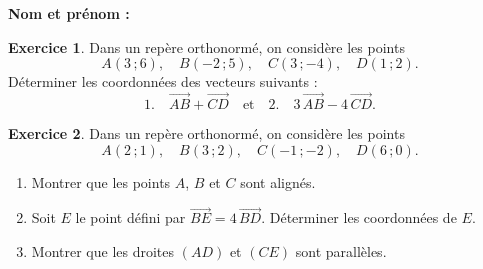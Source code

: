\documentclass{article}
\theoremstyle{definition}
\newtheorem{exercice}{Exercice}
\begin{document}
\pagestyle{fancy}

\fancyhf{} %
\fancyhead[L]{\large \textbf{\Niveau}}
\fancyhead[C]{\large \textbf{\ChapitreCourt}}

\large

\textbf{Nom et prénom :}\enspace\dotfill
\begin{exercice}
  Dans un repère orthonormé, on considère les points
  \[
    A(3\,;6),\quad
    B(-2\,;5),\quad
    C(3\,;-4),\quad
    D(1\,;2).
  \]
  Déterminer les coordonnées des vecteurs suivants :
  \[
    1.\quad \overrightarrow{AB} + \overrightarrow{CD}
    \quad\text{et}\quad
    2.\quad 3\,\overrightarrow{AB} - 4\,\overrightarrow{CD}.
  \]
  \begin{center}
  \end{center}
\end{exercice}

\begin{exercice}
  Dans un repère orthonormé, on considère les points
  \[
    A(2\,;1),\quad
    B(3\,;2),\quad
    C(-1\,;-2),\quad
    D(6\,;0).
  \]
  \begin{enumerate}
    \item Montrer que les points $A$, $B$ et $C$ sont alignés.
    \item Soit $E$ le point défini par $\overrightarrow{BE} = 4\,\overrightarrow{BD}$. Déterminer les coordonnées de $E$.
    \item Montrer que les droites $(AD)$ et $(CE)$ sont parallèles.
  \end{enumerate}
  \begin{center}
  \end{center}
\end{exercice}
\end{document}
